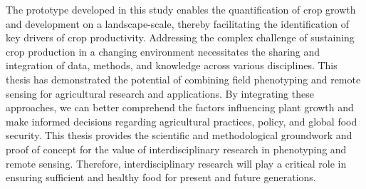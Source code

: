 The prototype developed in this study enables the quantification of crop growth and development on a landscape-scale, thereby facilitating the identification of key drivers of crop productivity. Addressing the complex challenge of sustaining crop production in a changing environment necessitates the sharing and integration of data, methods, and knowledge across various disciplines. This thesis has demonstrated the potential of combining field phenotyping and remote sensing for agricultural research and applications. By integrating these approaches, we can better comprehend the factors influencing plant growth and make informed decisions regarding agricultural practices, policy, and global food security. This thesis provides the scientific and methodological groundwork and proof of concept for the value of interdisciplinary research in phenotyping and remote sensing. Therefore, interdisciplinary research will play a critical role in ensuring sufficient and healthy food for present and future generations.